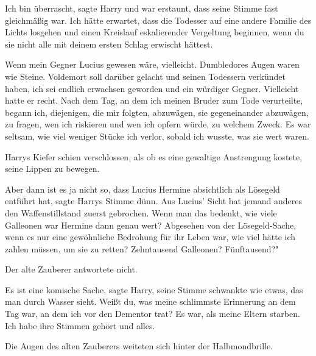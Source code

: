 \glqq Ich bin überrascht\grqq{}, sagte Harry und war erstaunt, dass seine Stimme
fast gleichmäßig war. \glqq Ich hätte erwartet, dass die Todesser auf eine
andere Familie des Lichts losgehen und einen Kreislauf eskalierender Vergeltung
beginnen, wenn du sie nicht alle mit deinem ersten Schlag erwischt
hättest.\grqq{}

\glqq Wenn mein Gegner Lucius gewesen wäre, vielleicht.\grqq{} Dumbledores Augen
waren wie Steine. \glqq Voldemort soll darüber gelacht und seinen Todessern
verkündet haben, ich sei endlich erwachsen geworden und ein würdiger Gegner.
Vielleicht hatte er recht. Nach dem Tag, an dem ich meinen Bruder zum Tode
verurteilte, begann ich, diejenigen, die mir folgten, abzuwägen, sie
gegeneinander abzuwägen, zu fragen, wen ich riskieren und wen ich opfern würde,
zu welchem Zweck. Es war seltsam, wie viel weniger Stücke ich verlor, sobald ich
wusste, was sie wert waren.\grqq{}

Harrys Kiefer schien verschlossen, als ob es eine gewaltige Anstrengung kostete,
seine Lippen zu bewegen.

\glqq Aber dann ist es ja nicht so, dass Lucius Hermine absichtlich als Lösegeld
entführt hat\grqq{}, sagte Harrys Stimme dünn. \glqq Aus Lucius' Sicht hat
jemand anderes den Waffenstillstand zuerst gebrochen. Wenn man das bedenkt, wie
viele Galleonen war Hermine dann genau wert? Abgesehen von der Lösegeld-Sache,
wenn es nur eine gewöhnliche Bedrohung für ihr Leben war, wie viel hätte ich
zahlen müssen, um sie zu retten? Zehntausend Galleonen? Fünftausend?"

Der alte Zauberer antwortete nicht.

\glqq Es ist eine komische Sache\grqq{}, sagte Harry, seine Stimme schwankte wie
etwas, das man durch Wasser sieht. \glqq Weißt du, was meine schlimmste
Erinnerung an dem Tag war, an dem ich vor den Dementor trat? Es war, als meine
Eltern starben. Ich habe ihre Stimmen gehört und alles.\grqq{}

Die Augen des alten Zauberers weiteten sich hinter der Halbmondbrille.

